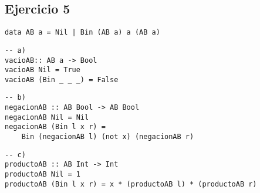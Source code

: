 \documentclass[10pt,a4paper]{article}
\begin{document}
\subsection{Ejercicio 5}
\begin{centrado}
\begin{verbatim}
data AB a = Nil | Bin (AB a) a (AB a)
\end{verbatim}
\end{centrado}
\begin{centrado}
	\begin{verbatim}
-- a)
vacioAB:: AB a -> Bool
vacioAB Nil = True
vacioAB (Bin _ _ _) = False
\end{verbatim}
\end{centrado}
\begin{centrado}
	\begin{verbatim}
-- b)
negacionAB :: AB Bool -> AB Bool
negacionAB Nil = Nil
negacionAB (Bin l x r) = 
	Bin (negacionAB l) (not x) (negacionAB r)
\end{verbatim}
\end{centrado}
\begin{centrado}
	\begin{verbatim}
-- c)
productoAB :: AB Int -> Int
productoAB Nil = 1
productoAB (Bin l x r) = x * (productoAB l) * (productoAB r)
\end{verbatim}
\end{centrado}
\end{document}
